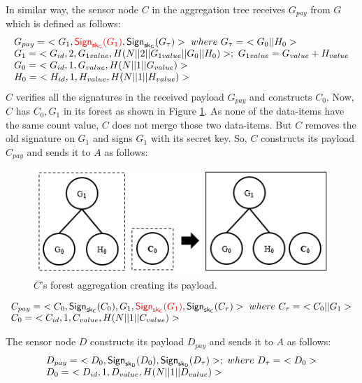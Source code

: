 	In similar way, the sensor node $C$ in the aggregation tree receives $G_{pay}$ from $G$ which is defined as follows:
	\begin{equation*}
		\begin{array}{l}
			G_{pay} =\ <G_{1},\textcolor{red}{\textsf{Sign}_{\sf{sk}_{G}}(G_{1})}, \textsf{Sign}_{\sf{sk}_{G}}(G_{\tau})>\ where\ G_{\tau} =\ <G_{0} || H_{0}>\\
			G_{1} =\ < G_{id}, 2, G_{1value}, H(N||2||G_{1value}||G_{0}||H_{0})>;\ G_{1value} = G_{value} + H_{value} \\
			G_{0} =\ <G_{id}, 1, G_{value}, H(N||1||G_{value})>\\
			H_{0} =\ <H_{id}, 1, H_{value}, H(N||1||H_{value})>
		\end{array}
	\end{equation*}
	$C$ verifies all the signatures in the received payload $G_{pay}$ and constructs $C_{0}$.
	Now, $C$ has $C_{0},G_{1}$ in its forest as shown in Figure \ref{fig:c-forest-payload}. 
	As none of the data-items have the same count value, $C$ does not merge those two data-items.
	But $C$ removes the old signature on $G_{1}$ and signs $G_{1}$ with its secret key.
	So, $C$ constructs its payload $C_{pay}$ and sends it to $A$ as follows:
	\begin{figure}[h!]
		\centering
		\includegraphics{images/c-forest-payload.png}
		\caption{$C$'s forest aggregation creating its payload.}
		\label{fig:c-forest-payload}
	\end{figure}
	\begin{equation*}
		\begin{array}{l}
			C_{pay} =\ <C_{0},\textsf{Sign}_{\sf{sk}_{C}}(C_{0}),G_{1},\textcolor{red}{\textsf{Sign}_{\sf{sk}_{C}}(G_{1})}, \textsf{Sign}_{\sf{sk}_{C}}(C_{\tau})>\ where\ C_{\tau} =\ <C_{0} || G_{1}>\\
			C_{0} =\ <C_{id}, 1, C_{value}, H(N||1||C_{value})>
		\end{array}
	\end{equation*}

	The sensor node $D$ constructs its payload $D_{pay}$ and sends it to $A$ as follows:
	\begin{equation*}
		\begin{array}{l}
			D_{pay} =\ <D_{0}, \textsf{Sign}_{\sf{sk}_{D}}(D_{0}), \textsf{Sign}_{\sf{sk}_{D}}(D_{\tau})>;\ where\ D_{\tau} =\ <D_{0}>\\
			D_{0} =\ <D_{id},1,D_{value},H(N||1||D_{value})>
		\end{array}
	\end{equation*}

